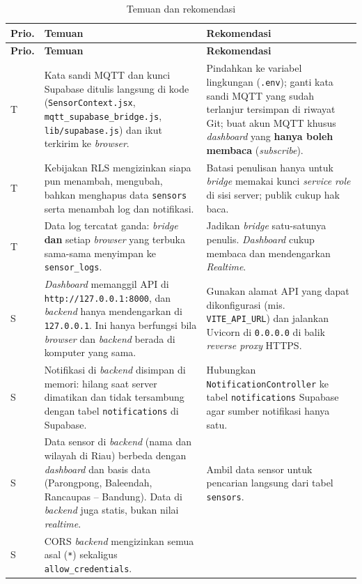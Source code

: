 \documentclass[11pt,a4paper]{article}
\newcommand{\kode}[1]{\texttt{#1}}
\begin{document}
\begin{longtable}{@{}p{0.6cm}p{4.6cm}p{8.6cm}@{}}
\caption{Temuan dan rekomendasi}\label{tab:temuan}\\
\toprule
\textbf{Prio.} & \textbf{Temuan} & \textbf{Rekomendasi} \\
\midrule
\endfirsthead
\toprule
\textbf{Prio.} & \textbf{Temuan} & \textbf{Rekomendasi} \\
\midrule
\endhead
\bottomrule
\endfoot
T & Kata sandi MQTT dan kunci Supabase ditulis langsung di kode (\kode{SensorContext.jsx}, \kode{mqtt\_supabase\_bridge.js}, \kode{lib/supabase.js}) dan ikut terkirim ke \textit{browser}. &
Pindahkan ke variabel lingkungan (\kode{.env}); ganti kata sandi MQTT yang sudah terlanjur tersimpan di riwayat Git; buat akun MQTT khusus \textit{dashboard} yang \textbf{hanya boleh membaca} (\textit{subscribe}). \\
T & Kebijakan RLS mengizinkan siapa pun menambah, mengubah, bahkan menghapus data \kode{sensors} serta menambah log dan notifikasi. &
Batasi penulisan hanya untuk \textit{bridge} memakai kunci \textit{service role} di sisi server; publik cukup hak baca. \\
T & Data log tercatat ganda: \textit{bridge} \textbf{dan} setiap \textit{browser} yang terbuka sama-sama menyimpan ke \kode{sensor\_logs}. &
Jadikan \textit{bridge} satu-satunya penulis. \textit{Dashboard} cukup membaca dan mendengarkan \textit{Realtime}. \\
S & \textit{Dashboard} memanggil API di \kode{http://127.0.0.1:8000}, dan \textit{backend} hanya mendengarkan di \kode{127.0.0.1}. Ini hanya berfungsi bila \textit{browser} dan \textit{backend} berada di komputer yang sama. &
Gunakan alamat API yang dapat dikonfigurasi (mis. \kode{VITE\_API\_URL}) dan jalankan Uvicorn di \kode{0.0.0.0} di balik \textit{reverse proxy} HTTPS. \\
S & Notifikasi di \textit{backend} disimpan di memori: hilang saat server dimatikan dan tidak tersambung dengan tabel \kode{notifications} di Supabase. &
Hubungkan \kode{NotificationController} ke tabel \kode{notifications} Supabase agar sumber notifikasi hanya satu. \\
S & Data sensor di \textit{backend} (nama dan wilayah di Riau) berbeda dengan \textit{dashboard} dan basis data (Parongpong, Baleendah, Rancaupas -- Bandung). Data di \textit{backend} juga statis, bukan nilai \textit{realtime}. &
Ambil data sensor untuk pencarian langsung dari tabel \kode{sensors}. \\
S & CORS \textit{backend} mengizinkan semua asal (\kode{*}) sekaligus \kode{allow\_credentials}. &

\end{longtable}
\end{document}
